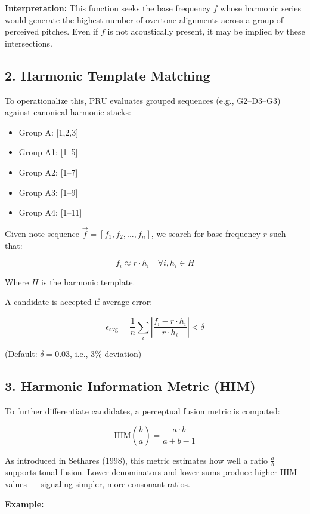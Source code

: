 \textbf{Interpretation:} This function seeks the base frequency $f$ whose harmonic series would generate the highest number of overtone alignments across a group of perceived pitches. Even if $f$ is not acoustically present, it may be implied by these intersections.

\subsection*{2. Harmonic Template Matching}

To operationalize this, PRU evaluates grouped sequences (e.g., G2–D3–G3) against canonical harmonic stacks:

\begin{itemize}
    \item Group A: [1,2,3]
    \item Group A1: [1–5]
    \item Group A2: [1–7]
    \item Group A3: [1–9]
    \item Group A4: [1–11]
\end{itemize}

Given note sequence $\vec{f} = [f_1, f_2, ..., f_n]$, we search for base frequency $r$ such that:

\[
f_i \approx r \cdot h_i \quad \forall i, h_i \in H
\]

Where $H$ is the harmonic template.

A candidate is accepted if average error:

\[
\epsilon_{\text{avg}} = \frac{1}{n} \sum_i \left| \frac{f_i - r \cdot h_i}{r \cdot h_i} \right| < \delta
\]

(Default: $\delta = 0.03$, i.e., 3\% deviation)

\subsection*{3. Harmonic Information Metric (HIM)}

To further differentiate candidates, a perceptual fusion metric is computed:

\[
\text{HIM}\left(\frac{b}{a}\right) = \frac{a \cdot b}{a + b - 1}
\]

As introduced in Sethares (1998), this metric estimates how well a ratio $\frac{a}{b}$ supports tonal fusion. Lower denominators and lower sums produce higher HIM values — signaling simpler, more consonant ratios.

\textbf{Example:}

